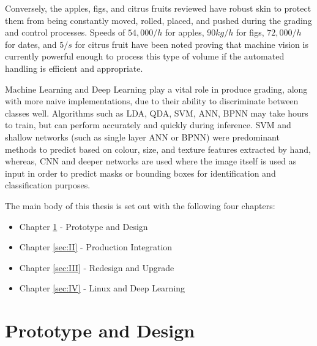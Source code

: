 \documentclass[fleqn,twoside]{article}
\begin{document}
Conversely, the apples, figs, and citrus fruits reviewed have robust skin to protect them from being constantly moved, rolled, placed, and pushed during the grading and control processes. Speeds of $54,000/h$ for apples, $90kg/h$ for figs, $72,000/h$ for dates, and $5/s$ for citrus fruit have been noted proving that machine vision is currently powerful enough to process this type of volume if the automated handling is efficient and appropriate.

Machine Learning and Deep Learning play a vital role in produce grading, along with more naive implementations, due to their ability to discriminate between classes well. Algorithms such as LDA, QDA, SVM, ANN, BPNN may take hours to train, but can perform accurately and quickly during inference. SVM and shallow networks (such as single layer ANN or BPNN) were predominant methods to predict based on colour, size, and texture features extracted by hand, whereas, CNN and deeper networks are used where the image itself is used as input in order to predict masks or bounding boxes for identification and classification purposes.

\quad
\quad


The main body of this thesis is set out with the following four chapters: 


\begin{itemize}
	\item Chapter \ref{sec:I} - Prototype and Design
	\item Chapter \ref{sec:II} - Production Integration 
	\item Chapter \ref{sec:III} - Redesign and Upgrade
	\item Chapter \ref{sec:IV} - Linux and Deep Learning 
\end{itemize}


 


\newpage

\section{Prototype and Design}
\label{sec:I}
\end{document}
